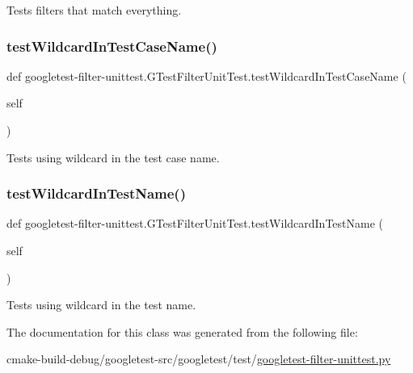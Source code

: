 \begin{DoxyVerb}Tests filters that match everything.\end{DoxyVerb}
 \mbox{\label{classgoogletest-filter-unittest_1_1GTestFilterUnitTest_a6bc13581aeb86a199706fd2592b5b5e5}} 
\subsubsection{\texorpdfstring{testWildcardInTestCaseName()}{testWildcardInTestCaseName()}}
{\footnotesize\ttfamily def googletest-\/filter-\/unittest.\+G\+Test\+Filter\+Unit\+Test.\+test\+Wildcard\+In\+Test\+Case\+Name (\begin{DoxyParamCaption}\item[{}]{self }\end{DoxyParamCaption})}

\begin{DoxyVerb}Tests using wildcard in the test case name.\end{DoxyVerb}
 \mbox{\label{classgoogletest-filter-unittest_1_1GTestFilterUnitTest_a57c51a39e4e5578dc6e0a0dd47c2875c}} 
\subsubsection{\texorpdfstring{testWildcardInTestName()}{testWildcardInTestName()}}
{\footnotesize\ttfamily def googletest-\/filter-\/unittest.\+G\+Test\+Filter\+Unit\+Test.\+test\+Wildcard\+In\+Test\+Name (\begin{DoxyParamCaption}\item[{}]{self }\end{DoxyParamCaption})}

\begin{DoxyVerb}Tests using wildcard in the test name.\end{DoxyVerb}
 

The documentation for this class was generated from the following file\+:\begin{DoxyCompactItemize}
\item 
cmake-\/build-\/debug/googletest-\/src/googletest/test/\mbox{\hyperlink{googletest-filter-unittest_8py}{googletest-\/filter-\/unittest.\+py}}\end{DoxyCompactItemize}
